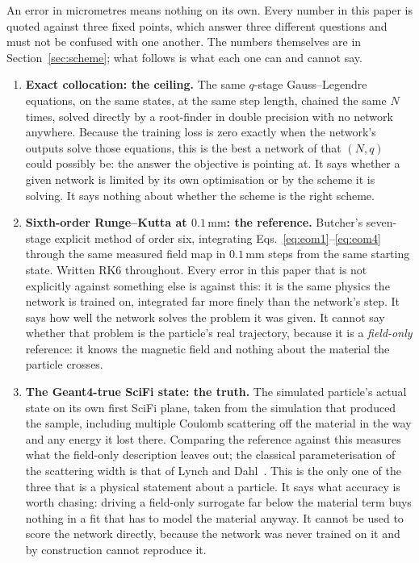 \documentclass[11pt,a4paper]{article}
\newcommand{\mm}{\ensuremath{\,\mathrm{mm}}}
\begin{document}
An error in micrometres means nothing on its own. Every number in this paper is
quoted against three fixed points, which answer three different questions and
must not be confused with one another. The numbers themselves are in
Section~\ref{sec:scheme}; what follows is what each one can and cannot say.

\begin{enumerate}
  \item \textbf{Exact collocation: the ceiling.} The same $q$-stage
  Gauss--Legendre equations, on the same states, at the same step length,
  chained the same $N$ times, solved directly by a root-finder in double
  precision with no network anywhere. Because the training loss is zero exactly
  when the network's outputs solve those equations, this is the best a network
  of that $(N, q)$ could possibly be: the answer the objective is pointing at.
  It says whether a given network is limited by its own optimisation or by the
  scheme it is solving. It says nothing about whether the scheme is the right
  scheme.
  \item \textbf{Sixth-order Runge--Kutta at $0.1\mm$: the reference.} Butcher's
  seven-stage explicit method of order six, integrating
  Eqs.~\eqref{eq:eom1}--\eqref{eq:eom4} through the same measured field map in
  $0.1\mm$ steps from the same starting state. Written RK6 throughout. Every
  error in this paper that is not explicitly against something else is against
  this: it is the same physics the network is trained on, integrated far more
  finely than the network's step. It says how well the network solves the
  problem it was given. It cannot say whether that problem is the particle's
  real trajectory, because it is a \emph{field-only} reference: it knows the
  magnetic field and nothing about the material the particle crosses.
  \item \textbf{The Geant4-true SciFi state: the truth.} The simulated
  particle's actual state on its own first SciFi plane, taken from the
  simulation that produced the sample, including multiple Coulomb scattering
  off the material in the way and any energy it lost there. Comparing the
  reference against this measures what the field-only description leaves out;
  the classical parameterisation of the scattering width is that of Lynch and
  Dahl~\citep{lynch1991}. This is the only one of the three that is a physical
  statement about a particle. It says what accuracy is worth chasing: driving a
  field-only surrogate far below the material term buys nothing in a fit that
  has to model the material anyway. It cannot be used to score the network
  directly, because the network was never trained on it and by construction
  cannot reproduce it.
\end{enumerate}
\end{document}
